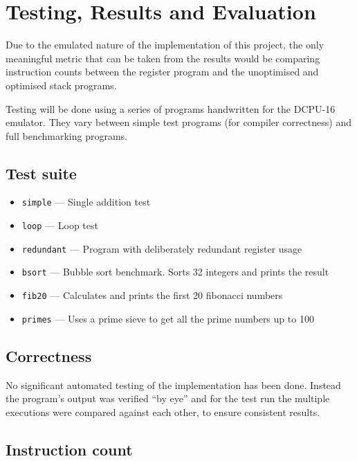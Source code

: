 \chapter{Testing, Results and Evaluation}\label{ch:testingresults}

Due to the emulated nature of the implementation of this project, the only
meaningful metric that can be taken from the results would be comparing
instruction counts between the register program and the unoptimised and
optimised stack programs.

Testing will be done using a series of programs handwritten for the DCPU-16
emulator. They vary between simple test programs (for compiler correctness) and
full benchmarking programs.

\section{Test suite}
\begin{itemize}
  \item \texttt{simple} --- Single addition test
  \item \texttt{loop} --- Loop test
  \item \texttt{redundant} --- Program with deliberately redundant register
  usage
  \item \texttt{bsort} --- Bubble sort benchmark. Sorts 32 integers and prints
  the result
  \item \texttt{fib20} --- Calculates and prints the first 20 fibonacci numbers
  \item \texttt{primes} --- Uses a prime sieve to get all the prime numbers up
  to 100
\end{itemize}

\section{Correctness}
No significant automated testing of the implementation has been done. Instead
the program's output was verified ``by eye'' and for the test run the multiple
executions were compared against each other, to ensure consistent results.

\section{Instruction count}

\tracedata%

